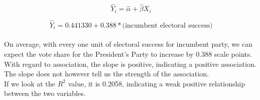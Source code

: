 \documentclass[12pt,letterpaper]{article}
\begin{document}
{\large 			$$\hat{Y}_i = \hat{\alpha} +  \hat{\beta}X_i $$}


{ 			$$\hat{Y}_i =  0.441330 +  0.388 * \text{(incumbent electoral success)} $$} \\


\noindent On average, with every one unit of electoral success for incumbent party, we can expect the vote share for the President's Party to increase by 0.388 scale points.\\

With regard to association, the slope is positive, indicating a positive association. The slope does not however tell us the strength of the association. \\

If we look at the $R^2$ value, it is 0.2058, indicating a weak positive relationship between the two variables.




\newpage	
\end{document}
